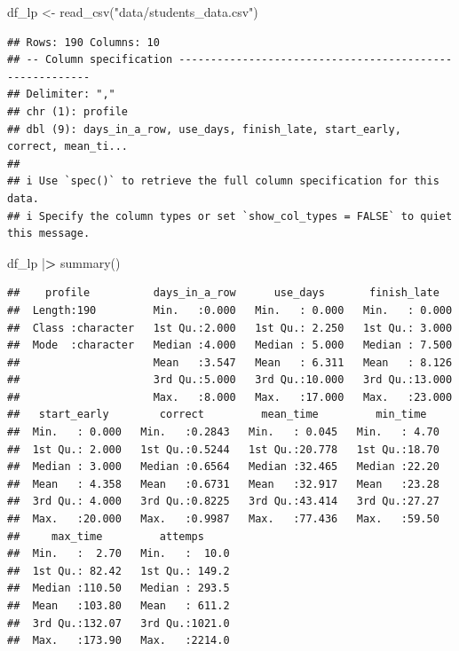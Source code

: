 \documentclass[
]{article}
\newenvironment{Shaded}{\begin{snugshade}}{\end{snugshade}}
\newcommand{\ErrorTok}[1]{\textcolor[rgb]{0.64,0.00,0.00}{\textbf{#1}}}
\newcommand{\FunctionTok}[1]{\textcolor[rgb]{0.00,0.00,0.00}{#1}}
\newcommand{\NormalTok}[1]{#1}
\newcommand{\OtherTok}[1]{\textcolor[rgb]{0.56,0.35,0.01}{#1}}
\newcommand{\SpecialCharTok}[1]{\textcolor[rgb]{0.00,0.00,0.00}{#1}}
\newcommand{\StringTok}[1]{\textcolor[rgb]{0.31,0.60,0.02}{#1}}
\begin{document}
\begin{Shaded}
\begin{Highlighting}[]
\NormalTok{df\_lp }\OtherTok{\textless{}{-}} \FunctionTok{read\_csv}\NormalTok{(}\StringTok{"data/students\_data.csv"}\NormalTok{)}
\end{Highlighting}
\end{Shaded}

\begin{verbatim}
## Rows: 190 Columns: 10
## -- Column specification --------------------------------------------------------
## Delimiter: ","
## chr (1): profile
## dbl (9): days_in_a_row, use_days, finish_late, start_early, correct, mean_ti...
## 
## i Use `spec()` to retrieve the full column specification for this data.
## i Specify the column types or set `show_col_types = FALSE` to quiet this message.
\end{verbatim}

\begin{Shaded}
\begin{Highlighting}[]
\NormalTok{df\_lp }\SpecialCharTok{|}\ErrorTok{\textgreater{}} \FunctionTok{summary}\NormalTok{()}
\end{Highlighting}
\end{Shaded}

\begin{verbatim}
##    profile          days_in_a_row      use_days       finish_late    
##  Length:190         Min.   :0.000   Min.   : 0.000   Min.   : 0.000  
##  Class :character   1st Qu.:2.000   1st Qu.: 2.250   1st Qu.: 3.000  
##  Mode  :character   Median :4.000   Median : 5.000   Median : 7.500  
##                     Mean   :3.547   Mean   : 6.311   Mean   : 8.126  
##                     3rd Qu.:5.000   3rd Qu.:10.000   3rd Qu.:13.000  
##                     Max.   :8.000   Max.   :17.000   Max.   :23.000  
##   start_early        correct         mean_time         min_time    
##  Min.   : 0.000   Min.   :0.2843   Min.   : 0.045   Min.   : 4.70  
##  1st Qu.: 2.000   1st Qu.:0.5244   1st Qu.:20.778   1st Qu.:18.70  
##  Median : 3.000   Median :0.6564   Median :32.465   Median :22.20  
##  Mean   : 4.358   Mean   :0.6731   Mean   :32.917   Mean   :23.28  
##  3rd Qu.: 4.000   3rd Qu.:0.8225   3rd Qu.:43.414   3rd Qu.:27.27  
##  Max.   :20.000   Max.   :0.9987   Max.   :77.436   Max.   :59.50  
##     max_time         attemps      
##  Min.   :  2.70   Min.   :  10.0  
##  1st Qu.: 82.42   1st Qu.: 149.2  
##  Median :110.50   Median : 293.5  
##  Mean   :103.80   Mean   : 611.2  
##  3rd Qu.:132.07   3rd Qu.:1021.0  
##  Max.   :173.90   Max.   :2214.0
\end{verbatim}
\end{document}
